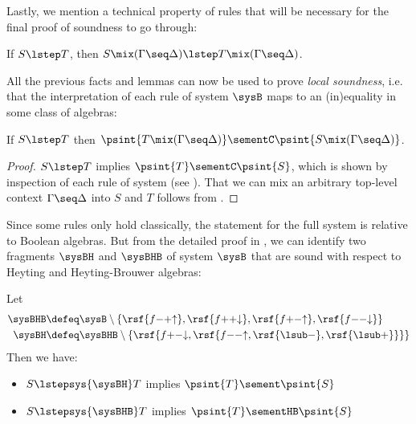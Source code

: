 Lastly, we mention a technical property of rules that will be necessary for the
final proof of soundness to go through:

\begin{fact}
  If $S \lstep T$, then $S \mix (\Gamma \seq \Delta) \lstep T \mix (\Gamma \seq \Delta)$.
\end{fact}

All the previous facts and lemmas can now be used to prove \emph{local
soundness}, i.e. that the interpretation of each rule of system $\sysB$ maps to
an (in)equality in some class of algebras:

\begin{lemma}
  
  If $S \lstep T$ then $\psint{T \mix (\Gamma \seq \Delta)} \sementC \psint{S
  \mix (\Gamma \seq \Delta)}$.
\end{lemma}
\begin{proof}
  $S \lstep T$ implies $\psint{T} \sementC \psint{S}$, which is shown by
  inspection of each rule of system  (see ).
  That we can mix an arbitrary top-level context $\Gamma \seq \Delta$ into $S$
  and $T$ follows from .
\end{proof}

Since some rules only hold classically, the statement for the full system is
relative to Boolean algebras. But from the detailed proof in
, we can identify two fragments $\sysBH$ and
$\sysBHB$ of system $\sysB$ that are sound with respect to Heyting and
Heyting-Brouwer algebras:

\begin{corollary}\label{cor:lsoundness}
  Let
  \begin{align*}
    \sysBHB &\defeq \sysB \setminus \{\rsf{f{-}{+}{\uparrow}}, \rsf{f{+}{+}{\downarrow}}, \rsf{f{+}{-}{\uparrow}}, \rsf{f{-}{-}{\downarrow}}\} \\
    \sysBH &\defeq \sysBHB \setminus \{\rsf{f{+}{-}{\downarrow}, \rsf{f{-}{-}{\uparrow}, \rsf{{\lsub}{-}}, \rsf{{\lsub}{+}}}}\}
  \end{align*}
  Then we have:
  \begin{itemize}
    \item $S \lstepsys{\sysBH} T$ implies $\psint{T} \sement \psint{S}$
    \item $S \lstepsys{\sysBHB} T$ implies $\psint{T} \sementHB \psint{S}$
  \end{itemize}
\end{corollary}

